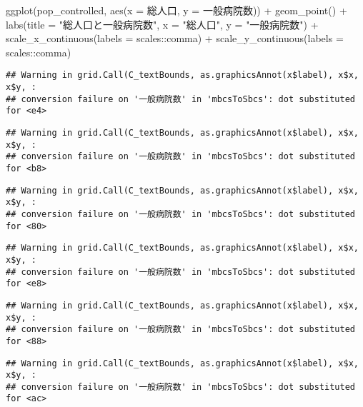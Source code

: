 \documentclass[
]{article}
\newenvironment{Shaded}{\begin{snugshade}}{\end{snugshade}}
\newcommand{\AttributeTok}[1]{\textcolor[rgb]{0.77,0.63,0.00}{#1}}
\newcommand{\FunctionTok}[1]{\textcolor[rgb]{0.00,0.00,0.00}{#1}}
\newcommand{\NormalTok}[1]{#1}
\newcommand{\SpecialCharTok}[1]{\textcolor[rgb]{0.00,0.00,0.00}{#1}}
\newcommand{\StringTok}[1]{\textcolor[rgb]{0.31,0.60,0.02}{#1}}
\begin{document}
\begin{Shaded}
\begin{Highlighting}[]
\FunctionTok{ggplot}\NormalTok{(pop\_controlled, }\FunctionTok{aes}\NormalTok{(}\AttributeTok{x =}\NormalTok{ 総人口, }\AttributeTok{y =}\NormalTok{ 一般病院数)) }\SpecialCharTok{+} \FunctionTok{geom\_point}\NormalTok{() }\SpecialCharTok{+} 
  \FunctionTok{labs}\NormalTok{(}\AttributeTok{title =} \StringTok{"総人口と一般病院数"}\NormalTok{, }\AttributeTok{x =} \StringTok{"総人口"}\NormalTok{, }\AttributeTok{y =} \StringTok{"一般病院数"}\NormalTok{) }\SpecialCharTok{+}
  \FunctionTok{scale\_x\_continuous}\NormalTok{(}\AttributeTok{labels =}\NormalTok{ scales}\SpecialCharTok{::}\NormalTok{comma) }\SpecialCharTok{+}
  \FunctionTok{scale\_y\_continuous}\NormalTok{(}\AttributeTok{labels =}\NormalTok{ scales}\SpecialCharTok{::}\NormalTok{comma)}
\end{Highlighting}
\end{Shaded}

\begin{verbatim}
## Warning in grid.Call(C_textBounds, as.graphicsAnnot(x$label), x$x, x$y, :
## conversion failure on '一般病院数' in 'mbcsToSbcs': dot substituted for <e4>
\end{verbatim}

\begin{verbatim}
## Warning in grid.Call(C_textBounds, as.graphicsAnnot(x$label), x$x, x$y, :
## conversion failure on '一般病院数' in 'mbcsToSbcs': dot substituted for <b8>
\end{verbatim}

\begin{verbatim}
## Warning in grid.Call(C_textBounds, as.graphicsAnnot(x$label), x$x, x$y, :
## conversion failure on '一般病院数' in 'mbcsToSbcs': dot substituted for <80>
\end{verbatim}

\begin{verbatim}
## Warning in grid.Call(C_textBounds, as.graphicsAnnot(x$label), x$x, x$y, :
## conversion failure on '一般病院数' in 'mbcsToSbcs': dot substituted for <e8>
\end{verbatim}

\begin{verbatim}
## Warning in grid.Call(C_textBounds, as.graphicsAnnot(x$label), x$x, x$y, :
## conversion failure on '一般病院数' in 'mbcsToSbcs': dot substituted for <88>
\end{verbatim}

\begin{verbatim}
## Warning in grid.Call(C_textBounds, as.graphicsAnnot(x$label), x$x, x$y, :
## conversion failure on '一般病院数' in 'mbcsToSbcs': dot substituted for <ac>
\end{verbatim}
\end{document}
